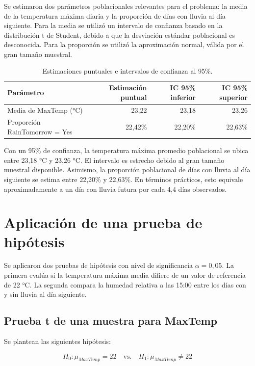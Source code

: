 \documentclass[11pt,a4paper]{article}
\begin{document}
Se estimaron dos parámetros poblacionales relevantes para el problema: la media de la temperatura máxima diaria y la proporción de días con lluvia al día siguiente. Para la media se utilizó un intervalo de confianza basado en la distribución t de Student, debido a que la desviación estándar poblacional es desconocida. Para la proporción se utilizó la aproximación normal, válida por el gran tamaño muestral.

\begin{table}[htbp]
\centering
\small
\begin{tabular}{lrrr}
\toprule
Parámetro & Estimación puntual & IC 95\% inferior & IC 95\% superior \\
\midrule
Media de MaxTemp (°C) & 23,22 & 23,18 & 23,26 \\
Proporción RainTomorrow = Yes & 22,42\% & 22,20\% & 22,63\% \\
\bottomrule
\end{tabular}
\caption{Estimaciones puntuales e intervalos de confianza al 95\%.}
\label{tab:ic}
\end{table}

Con un 95\% de confianza, la temperatura máxima promedio poblacional se ubica entre 23,18 °C y 23,26 °C. El intervalo es estrecho debido al gran tamaño muestral disponible. Asimismo, la proporción poblacional de días con lluvia al día siguiente se estima entre 22,20\% y 22,63\%. En términos prácticos, esto equivale aproximadamente a un día con lluvia futura por cada 4,4 días observados.

\section{Aplicación de una prueba de hipótesis}

Se aplicaron dos pruebas de hipótesis con nivel de significancia \(\alpha = 0{,}05\). La primera evalúa si la temperatura máxima media difiere de un valor de referencia de 22 °C. La segunda compara la humedad relativa a las 15:00 entre los días con y sin lluvia al día siguiente.

\subsection{Prueba t de una muestra para MaxTemp}

Se plantean las siguientes hipótesis:

\[
H_0: \mu_{MaxTemp} = 22 \quad \text{vs.} \quad H_1: \mu_{MaxTemp} \neq 22
\]
\end{document}
